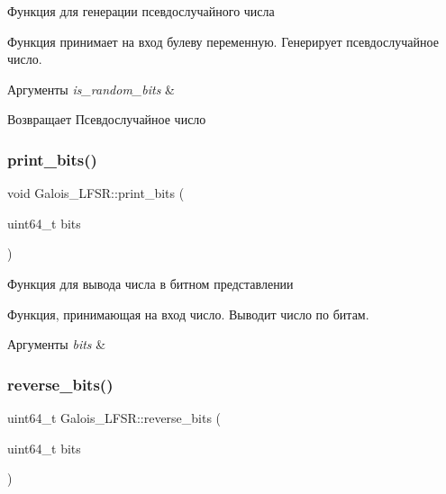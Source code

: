 Функция для генерации псевдослучайного числа 

Функция принимает на вход булеву переменную. Генерирует псевдослучайное число.


\begin{DoxyParams}{Аргументы}
{\em is\+\_\+random\+\_\+bits} & \\
\hline
\end{DoxyParams}
\begin{DoxyReturn}{Возвращает}
Псевдослучайное число 
\end{DoxyReturn}
\mbox{\label{classGalois__LFSR_a7a2d2fa3f9f7973cb520d92267f58f4d}} 
\subsubsection{\texorpdfstring{print\+\_\+bits()}{print\_bits()}}
{\footnotesize\ttfamily void Galois\+\_\+\+L\+F\+S\+R\+::print\+\_\+bits (\begin{DoxyParamCaption}\item[{uint64\+\_\+t}]{bits }\end{DoxyParamCaption})}



Функция для вывода числа в битном представлении 

Функция, принимающая на вход число. Выводит число по битам.


\begin{DoxyParams}{Аргументы}
{\em bits} & \\
\hline
\end{DoxyParams}
\mbox{\label{classGalois__LFSR_ae8b9c21348f0f6f75c539e7a8667be88}} 
\subsubsection{\texorpdfstring{reverse\+\_\+bits()}{reverse\_bits()}}
{\footnotesize\ttfamily uint64\+\_\+t Galois\+\_\+\+L\+F\+S\+R\+::reverse\+\_\+bits (\begin{DoxyParamCaption}\item[{uint64\+\_\+t}]{bits }\end{DoxyParamCaption})}



